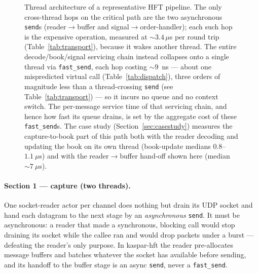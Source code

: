 \documentclass[11pt]{article}
\newcommand{\fs}{\texttt{fast\_send}}
\newcommand{\snd}{\texttt{send}}
\begin{document}
\begin{figure}[t]
{%
}
\caption{Thread architecture of a representative HFT pipeline. The only
cross-thread hops on the critical
path are the two asynchronous \snd{}s (reader$\to$buffer and
signal$\to$order-handler); each such hop is the expensive operation, measured at
$\sim\!3.4\,\mu$s per round trip (Table~\ref{tab:transport}), because it wakes
another thread. The entire decode/book/signal servicing chain instead collapses
onto a single thread via \fs{}, each hop costing $\sim\!9$~ns --- about one
mispredicted virtual call (Table~\ref{tab:dispatch}), three orders of magnitude less than a thread-crossing \snd{} (see
Table~\ref{tab:transport}) --- so it incurs no queue and no context switch. The
per-message service time of that servicing chain, and hence how fast its queue
drains, is set by the aggregate cost of these \fs{}s. The case study
(Section~\ref{sec:casestudy}) measures the capture-to-book part of this path
both with the reader decoding and updating the book on its own thread
(book-update medians $0.8$--$1.1~\mu$s) and with the reader$\to$buffer
hand-off shown here (median $\sim\!7~\mu$s).}
\label{fig:hftarch}
\end{figure}

\paragraph{Section 1 --- capture (two threads).} One socket-reader actor per
channel does nothing but drain its UDP socket and hand each datagram to the next
stage by an \emph{asynchronous} \snd{}. It must be asynchronous: a reader that
made a synchronous, blocking call would stop draining its socket while the callee
ran and would drop packets under a burst --- defeating the reader's only purpose.
In kaspar-hft the reader pre-allocates message buffers and batches whatever the
socket has available before sending, and its handoff to the buffer stage is an
async \snd{}, never a \fs{}.
\end{document}
